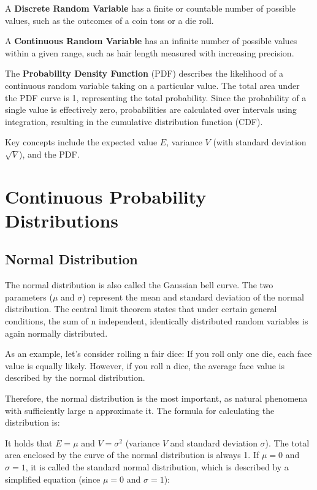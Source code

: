A \textbf{Discrete Random Variable} has a finite or countable number of possible values, such as the outcomes of a coin toss or a die roll.

A \textbf{Continuous Random Variable} has an infinite number of possible values within a given range, such as hair length measured with increasing precision.

The \textbf{Probability Density Function} (PDF) describes the likelihood of a continuous random variable taking on a particular value. The total area under the PDF curve is 1, representing the total probability. Since the probability of a single value is effectively zero, probabilities are calculated over intervals using integration, resulting in the cumulative distribution function (CDF).

Key concepts include the expected value $E$, variance $V$ (with standard deviation $\sqrt{V}$), and the PDF.

\section{Continuous Probability Distributions}\label{Continuous Probability Distributions}

\subsection{Normal Distribution}\label{Normal Distribution}
The normal distribution is also called the Gaussian bell curve. The two parameters ($\mu$ and $\sigma$) represent the mean and standard deviation of the normal distribution. The central limit theorem states that under certain general conditions, the sum of n independent, identically distributed random variables is again normally distributed.

As an example, let's consider rolling n fair dice: If you roll only one die, each face value is equally likely. However, if you roll n dice, the average face value is described by the normal distribution.

Therefore, the normal distribution is the most important, as natural phenomena with sufficiently large n approximate it. The formula for calculating the distribution is:

It holds that $E=\mu$ and $V=\sigma^2$ (variance $V$ and standard deviation $\sigma$). The total area enclosed by the curve of the normal distribution is always 1. If $\mu=0$ and $\sigma=1$, it is called the standard normal distribution, which is described by a simplified equation (since $\mu=0$ and $\sigma=1$):

